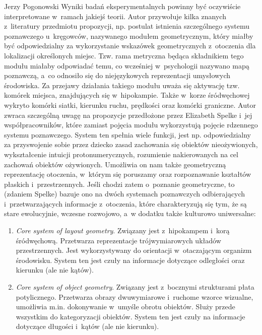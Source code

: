 \begin{newrevplenv}{Jerzy Pogonowski}
Wyniki badań eksperymentalnych powinny być oczywiście
interpretowane w~ramach jakiejś teorii. Autor przywołuje kilka
znanych z~literatury przedmiotu propozycji, np. postulat istnienia
szczególnego systemu poznawczego u~kręgowców, nazywanego modułem
geometrycznym, który miałby być odpowiedzialny za wykorzystanie
wskazówek geometrycznych z~otoczenia dla lokalizacji określonych
miejsc. Tzw. rama metryczna będąca składnikiem tego modułu miałaby
odpowiadać temu, co wcześniej w~psychologii nazywano mapą
poznawczą, a~co odnosiło się do niejęzykowych reprezentacji
umysłowych środowiska. Za przejawy działania takiego modułu uważa
się aktywację tzw. komórek miejsca, znajdujących się w~hipokampie.
Także w~korze śródwęchowej wykryto komórki siatki, kierunku ruchu,
prędkości oraz komórki graniczne. Autor zwraca szczególną uwagę na
propozycje przedłożone przez Elizabeth Spelke i~jej
współpracowników, które zamiast pojęcia modułu wykorzystują
pojęcie rdzennego systemu poznawczego. System ten spełnia wiele
funkcji, jest np. odpowiedzialny za przyswojenie sobie przez
dziecko zasad zachowania się obiektów nieożywionych, wykształcenie
intuicji protonumerycznych, rozumienie nakierowanych na cel
zachowań obiektów ożywionych. Umożliwia on nam także geometryczną
reprezentację otoczenia, w~którym się poruszamy oraz rozpoznawanie
kształtów płaskich i~przestrzennych. Jeśli chodzi zatem o~poznanie
geometryczne, to (zdaniem Spelke) bazuje ono na dwóch systemach
poznawczych odbierających i~przetwarzających informacje z~otoczenia, które charakteryzują się tym, że są stare ewolucyjnie,
wczesne rozwojowo, a~w dodatku także kulturowo uniwersalne:

\begin{enumerate}

\item {\em Core system of layout geometry}. Związany jest z~hipokampem i~korą śródwęchową. Przetwarza reprezentacje
trójwymiarowych układów przestrzennych. Jest wykorzystywany do
orientacji w~otaczającym organizm środowisku. System ten jest
czuły na informacje dotyczące odległości oraz kierunku (ale nie
kątów).

\item {\em Core system of object geometry}. Związany jest z~bocznymi strukturami płata potylicznego. Przetwarza obrazy
dwuwymiarowe i~ruchome wzorce wizualne, umożliwia m.in.
dokonywanie w~umyśle obrotu obiektów. Służy przede wszystkim do
kategoryzacji obiektów. System ten jest czuły na informacje
dotyczące długości i~kątów (ale nie kierunku).


\end{enumerate}
\end{newrevplenv}
